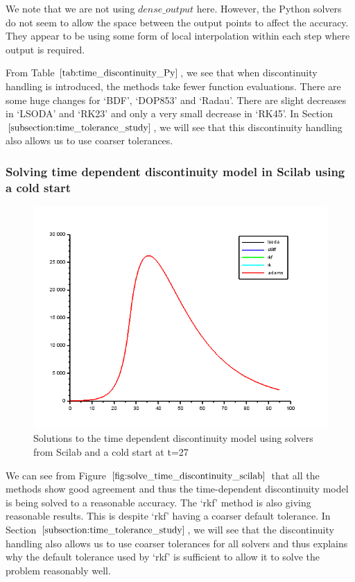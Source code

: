 We note that we are not using $dense\_output$ here. However, the Python solvers do not seem to allow the space between the output points to affect the accuracy. They appear to be using some form of local interpolation within each step where output is required.

From Table $\ref{tab:time_discontinuity_Py}$, we see that when discontinuity handling is introduced, the methods take fewer function evaluations. There are some huge changes for `BDF', `DOP853' and `Radau'. There are slight decreases in `LSODA' and `RK23' and only a very small decrease in `RK45'. In Section $\ref{subsection:time_tolerance_study}$, we will see that this discontinuity handling also allows us to use coarser tolerances.

\subsubsection{Solving time dependent discontinuity model in Scilab using a cold start} 
\begin{figure}[H]
\centering
\includegraphics[width=0.7\linewidth]{./figures/solve_time_discontinuity_scilab}
\caption{Solutions to the time dependent discontinuity model using solvers from Scilab and a cold start at t=27}
\label{fig:solve_time_discontinuity_scilab}
\end{figure}
We can see from Figure $\ref{fig:solve_time_discontinuity_scilab}$ that all the methods show good agreement and thus the time-dependent discontinuity model is being solved to a reasonable accuracy. The `rkf' method is also giving reasonable results. This is despite `rkf' having a coarser default tolerance. In Section $\ref{subsection:time_tolerance_study}$, we will see that the discontinuity handling also allows us to use coarser tolerances for all solvers and thus explains why the default tolerance used by `rkf' is sufficient to allow it to solve the problem reasonably well.

